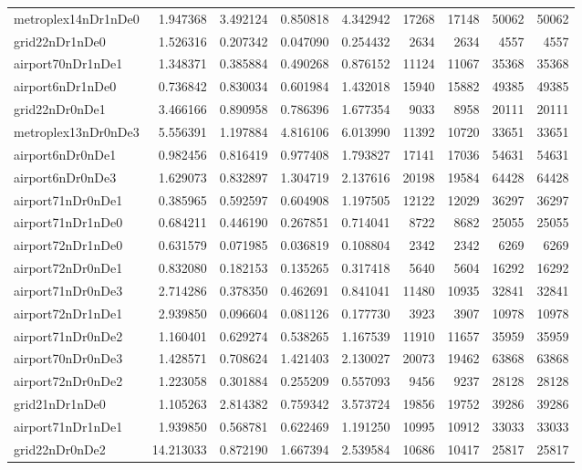 \begin{longtable}{|l|r|r|r|r|r|r|r|r|}
metroplex14nDr1nDe0 & 1.947368 & 3.492124 & 0.850818 & 4.342942 & 17268 & 17148 & 50062 & 50062 \\
grid22nDr1nDe0 & 1.526316 & 0.207342 & 0.047090 & 0.254432 & 2634 & 2634 & 4557 & 4557 \\
airport70nDr1nDe1 & 1.348371 & 0.385884 & 0.490268 & 0.876152 & 11124 & 11067 & 35368 & 35368 \\
airport6nDr1nDe0 & 0.736842 & 0.830034 & 0.601984 & 1.432018 & 15940 & 15882 & 49385 & 49385 \\
grid22nDr0nDe1 & 3.466166 & 0.890958 & 0.786396 & 1.677354 & 9033 & 8958 & 20111 & 20111 \\
metroplex13nDr0nDe3 & 5.556391 & 1.197884 & 4.816106 & 6.013990 & 11392 & 10720 & 33651 & 33651 \\
airport6nDr0nDe1 & 0.982456 & 0.816419 & 0.977408 & 1.793827 & 17141 & 17036 & 54631 & 54631 \\
airport6nDr0nDe3 & 1.629073 & 0.832897 & 1.304719 & 2.137616 & 20198 & 19584 & 64428 & 64428 \\
airport71nDr0nDe1 & 0.385965 & 0.592597 & 0.604908 & 1.197505 & 12122 & 12029 & 36297 & 36297 \\
airport71nDr1nDe0 & 0.684211 & 0.446190 & 0.267851 & 0.714041 & 8722 & 8682 & 25055 & 25055 \\
airport72nDr1nDe0 & 0.631579 & 0.071985 & 0.036819 & 0.108804 & 2342 & 2342 & 6269 & 6269 \\
airport72nDr0nDe1 & 0.832080 & 0.182153 & 0.135265 & 0.317418 & 5640 & 5604 & 16292 & 16292 \\
airport71nDr0nDe3 & 2.714286 & 0.378350 & 0.462691 & 0.841041 & 11480 & 10935 & 32841 & 32841 \\
airport72nDr1nDe1 & 2.939850 & 0.096604 & 0.081126 & 0.177730 & 3923 & 3907 & 10978 & 10978 \\
airport71nDr0nDe2 & 1.160401 & 0.629274 & 0.538265 & 1.167539 & 11910 & 11657 & 35959 & 35959 \\
airport70nDr0nDe3 & 1.428571 & 0.708624 & 1.421403 & 2.130027 & 20073 & 19462 & 63868 & 63868 \\
airport72nDr0nDe2 & 1.223058 & 0.301884 & 0.255209 & 0.557093 & 9456 & 9237 & 28128 & 28128 \\
grid21nDr1nDe0 & 1.105263 & 2.814382 & 0.759342 & 3.573724 & 19856 & 19752 & 39286 & 39286 \\
airport71nDr1nDe1 & 1.939850 & 0.568781 & 0.622469 & 1.191250 & 10995 & 10912 & 33033 & 33033 \\
grid22nDr0nDe2 & 14.213033 & 0.872190 & 1.667394 & 2.539584 & 10686 & 10417 & 25817 & 25817 \\

\end{longtable}
